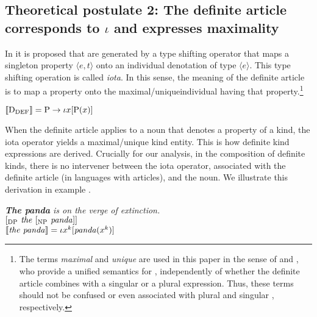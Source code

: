 \documentclass[output=paper
,modfonts
,nonflat]{langsci/langscibook}
\begin{document}
	\subsection[Theoretical postulate 2: The definite article corresponds to ι and expresses maximality]{Theoretical postulate 2: The definite article corresponds to $\iota$ and expresses maximality}
	
	In \citet{Partee1987} it is proposed that  are generated by a type shifting operator that maps a singleton property $\langle e, t\rangle$ onto an individual denotation of type $\langle e\rangle$. This type shifting operation is called \textit{iota}. In this sense, the meaning of the definite article is to map a property onto the maximal/unique\largerpage individual having that property.\footnote{The terms \textit{maximal} and \textit{unique} are used in this paper in the sense of \citet{Sharvy1980} and \citet{Link1983}, who provide a unified semantics for , independently of whether the definite article combines with a singular or a plural expression. Thus, these terms should not be confused or even associated with plural and singular , respectively.}
	
	\ea \label{ex:borik:6}
	$[\![\mbox{D}_{\mbox{\scriptsize{DEF}}}]\!] = \mbox{P} \rightarrow \iota{x} [\mbox{P}(x)]$
	\z
	
	When the definite article applies to a noun that denotes a property of a kind, the iota operator yields a maximal/unique kind entity. This is how definite kind expressions are derived. Crucially for our analysis, in the composition of definite kinds, there is no intervener between the iota operator, associated with the definite article (in languages with articles), and the noun. We illustrate this derivation in example . 
	
	\ea\label{ex:borik:7}
	\ea\label{ex:borik:7a}
	\textit{
		\textbf{The panda} is on the verge of extinction.} \\
	\ex\label{ex:borik:7b}
	$[_{\mbox{\scriptsize{DP}}} \mbox{\textit{ the }} [_{\mbox{\scriptsize{NP}}} \mbox{\textit{ panda}} ]]$\\
	\ex\label{ex:borik:7c}
	$[\![\mbox{\textit{the panda}}]\!] = \iota{x^k} [\mbox{\textit{panda}}(x^k)]$
	\z
	\z
	
\end{document}
